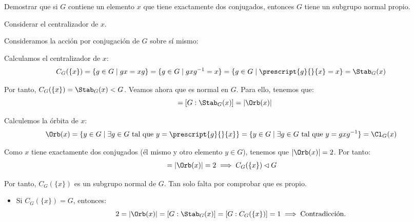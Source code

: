 \begin{ejercicio}\label{ej:6.4}
    Demostrar que si $G$ contiene un elemento $x$ que tiene exactamente dos conjugados, entonces $G$ tiene un subgrupo normal propio.
    \begin{observacion}
        Considerar el centralizador de $x$.
    \end{observacion}


    Consideramos la acción por conjugación de $G$ sobre sí mismo:

    Calculamos el centralizador de $x$:
    \begin{align*}
        C_G(\{x\}) &= \{g \in G \mid gx = xg\} = \{g \in G \mid gxg^{-1} = x\} = \{g \in G \mid \prescript{g}{}{x} = x\} = \Stab_G(x)
    \end{align*}

    Por tanto, $C_G(\{x\}) = \Stab_G(x)<G$. Veamos ahora que es normal en $G$. Para ello, tenemos que:
    \begin{equation*}
        [G:C_G(\{x\})] = [G:\Stab_G(x)] = |\Orb(x)|
    \end{equation*}

    Calculemos la órbita de $x$:
    \begin{align*}
        \Orb(x) &= \{y\in G \mid \exists g \in G \text{ tal que } y = \prescript{g}{}{x}\} = \{y\in G \mid \exists g \in G \text{ tal que } y = gxg^{-1}\}
        = \Cl_G(x)
    \end{align*}

    Como $x$ tiene exactamente dos conjugados (él mismo y otro elemento $y\in G$), tenemos que $|\Orb(x)| = 2$. Por tanto:
    \begin{align*}
        [G:C_G(\{x\})] &= |\Orb(x)| = 2 \implies C_G(\{x\})\lhd G
    \end{align*}

    Por tanto, $C_G(\{x\})$ es un subgrupo normal de $G$. Tan solo falta por comprobar que es propio.
    \begin{itemize}
        \item Si $C_G(\{x\}) = G$, entonces:
        \begin{equation*}
            2 = |\Orb(x)| = [G:\Stab_G(x)] = [G:C_G(\{x\})] = 1 \implies \text{Contradicción.}
        \end{equation*}


\end{itemize}
\end{ejercicio}
